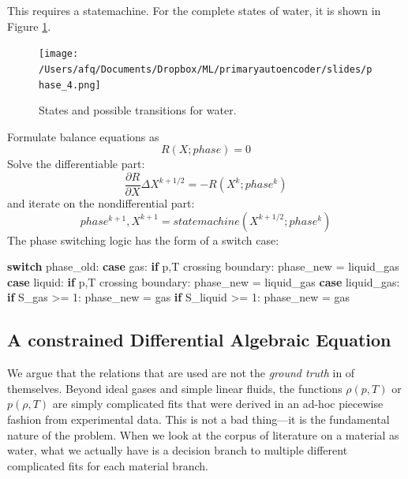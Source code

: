 \documentclass[]{article}
\newenvironment{Shaded}{}{}
\newcommand{\ControlFlowTok}[1]{\textcolor[rgb]{0.00,0.44,0.13}{\textbf{#1}}}
\newcommand{\DecValTok}[1]{\textcolor[rgb]{0.25,0.63,0.44}{#1}}
\newcommand{\NormalTok}[1]{#1}
\begin{document}
  This requires a statemachine. For the complete states of water, it is shown in Figure \ref{fig:statemachine}.
  \begin{figure}
    \texttt{[image: /Users/afq/Documents/Dropbox/ML/primaryautoencoder/slides/phase\_4.png]}
    \caption{\label{fig:statemachine}States and possible transitions for water.}
\end{figure}
Formulate balance equations as
\begin{equation}
R(X ; phase) = 0
\end{equation}
Solve the differentiable part:
\[\frac{\partial R}{\partial X}\Delta X^{k+1/2} = -R(X^k ; phase^k)\]
and iterate on the nondifferential part:
\[phase^{k+1},X^{k+1} = statemachine(X^{k+1/2} ; phase^k)\]
The phase switching logic has the form of a switch case:

\begin{Shaded}
\begin{Highlighting}[]
\ControlFlowTok{switch}\NormalTok{ phase_old:}
  \ControlFlowTok{case}\NormalTok{ gas:}
    \ControlFlowTok{if}\NormalTok{ p,T crossing boundary:}
\NormalTok{      phase_new = liquid_gas}
  \ControlFlowTok{case}\NormalTok{ liquid:}
    \ControlFlowTok{if}\NormalTok{ p,T crossing boundary:}
\NormalTok{      phase_new = liquid_gas}
  \ControlFlowTok{case}\NormalTok{ liquid_gas:}
    \ControlFlowTok{if}\NormalTok{ S_gas >= }\DecValTok{1}\NormalTok{:}
\NormalTok{      phase_new = gas}
    \ControlFlowTok{if}\NormalTok{ S_liquid >= }\DecValTok{1}\NormalTok{:}
\NormalTok{      phase_new = gas}
\end{Highlighting}
\end{Shaded}

\hypertarget{header-n3262}{%
\subsection{A constrained Differential Algebraic
Equation}\label{header-n3262}}

We argue that the relations that are used are not the \emph{ground
truth} in of themselves. Beyond ideal gases and simple linear fluids,
the functions \(\rho(p,T)\) or \(p(\rho,T)\) are simply complicated fits
that were derived in an ad-hoc piecewise fashion from experimental data.
This is not a bad thing---it is the fundamental nature of the problem.
When we look at the corpus of literature on a material as water, what we
actually have is a decision branch to multiple different complicated
fits for each material branch.
\end{document}
